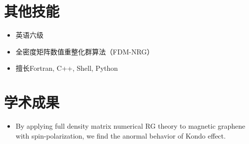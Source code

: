 \documentclass{resume}
\begin{document}
\section{其他技能}
\begin{itemize}[parsep=0.5ex]
\item 英语六级
\item 全密度矩阵数值重整化群算法（FDM-NRG）
\item 擅长Fortran, C++, Shell, Python
\end{itemize}

\section{学术成果}
\begin{itemize}[parsep=0.5ex]
\item By applying full density matrix numerical RG theory to magnetic graphene with
  spin-polarization, we find the anormal behavior of Kondo effect.
\end{itemize}


%  
\end{document}
